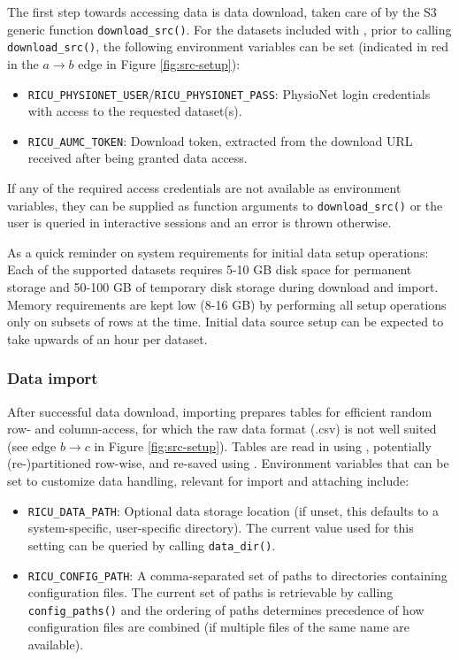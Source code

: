 \documentclass[
  notitle,
  nojss,
  noheadings]{jss}
\providecommand{\tightlist}{%
  \setlength{\itemsep}{0pt}\setlength{\parskip}{0pt}}
\begin{document}
The first step towards accessing data is data download, taken care of by
the S3 generic function \texttt{download\_src()}. For the datasets
included with , prior to calling \texttt{download\_src()}, the
following environment variables can be set (indicated in red in the
\(a \to b\) edge in Figure \ref{fig:src-setup}):

\begin{itemize}
\tightlist
\item
  \texttt{RICU\_PHYSIONET\_USER}/\texttt{RICU\_PHYSIONET\_PASS}:
  PhysioNet login credentials with access to the requested dataset(s).
\item
  \texttt{RICU\_AUMC\_TOKEN}: Download token, extracted from the
  download URL received after being granted data access.
\end{itemize}

If any of the required access credentials are not available as
environment variables, they can be supplied as function arguments to
\texttt{download\_src()} or the user is queried in interactive sessions
and an error is thrown otherwise.

As a quick reminder on system requirements for initial data setup
operations: Each of the supported datasets requires 5-10 GB disk space
for permanent storage and 50-100 GB of temporary disk storage during
download and import. Memory requirements are kept low (8-16 GB) by
performing all setup operations only on subsets of rows at the time.
Initial data source setup can be expected to take upwards of an hour per
dataset.

\hypertarget{data-import}{%
\subsubsection{Data import}\label{data-import}}

After successful data download, importing prepares tables for efficient
random row- and column-access, for which the raw data format (.csv) is
not well suited (see edge \(b \to c\) in Figure \ref{fig:src-setup}).
Tables are read in using  \citep{hester2020}, potentially
(re-)partitioned row-wise, and re-saved using . Environment
variables that can be set to customize  data handling,
relevant for import and attaching include:

\begin{itemize}
\tightlist
\item
  \texttt{RICU\_DATA\_PATH}: Optional data storage location (if unset,
  this defaults to a system-specific, user-specific directory). The
  current value used for this setting can be queried by calling
  \texttt{data\_dir()}.
\item
  \texttt{RICU\_CONFIG\_PATH}: A comma-separated set of paths to
  directories containing configuration files. The current set of paths
  is retrievable by calling \texttt{config\_paths()} and the ordering of
  paths determines precedence of how configuration files are combined
  (if multiple files of the same name are available).
\end{itemize}
\end{document}
